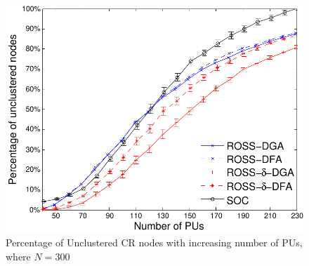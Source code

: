 \documentclass[times]{ettauth}
\theoremstyle{mytheoremstyle}
\theoremstyle{mytheoremstyle}
\theoremstyle{mytheoremstyle}
\begin{document}
\begin{figure}[t]
\begin{multicols}{3}
    \includegraphics[width=\linewidth]{survival_rate_300_edge50.pdf}\par\caption{Percentage of Unclustered CR nodes with increasing number of PUs, where $N=300$}\label{singleton_clusters_300}
\end{multicols}
\end{figure}

\end{document}
